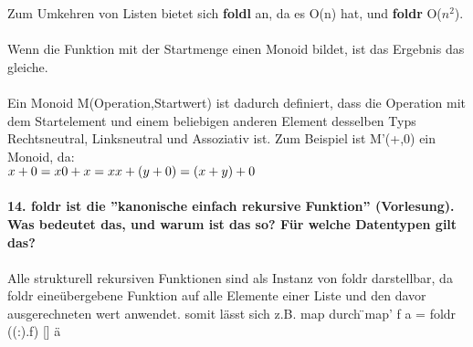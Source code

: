 \documentclass{article}
\begin{document}
Zum Umkehren von Listen bietet sich \textbf{foldl} an, da es O(n) hat, und \textbf{foldr} O($n^2$).
\\
\\
Wenn die Funktion mit der Startmenge einen Monoid bildet, ist das Ergebnis das gleiche.\\
\\
Ein Monoid M(Operation,Startwert) ist dadurch definiert, dass die Operation mit dem Startelement und einem beliebigen anderen Element desselben Typs Rechtsneutral, Linksneutral und Assoziativ ist. Zum Beispiel ist M'(+,0) ein Monoid, da:\\
$x+0 = x\\
0+x = x\\
x+(y+0) = (x+y)+0$\\
\\
\textbf{14. foldr ist die ''kanonische einfach rekursive Funktion'' (Vorlesung). Was bedeutet das, und warum ist das so? Für welche Datentypen gilt das?}\\
\\
Alle strukturell rekursiven Funktionen sind als Instanz von foldr darstellbar, da foldr eine\"ubergebene Funktion auf alle Elemente einer Liste und den davor ausgerechneten wert anwendet. somit l\"asst sich z.B. map durch \"{}map' f a = foldr ((:).f) [] a\"{}
\end{document}
